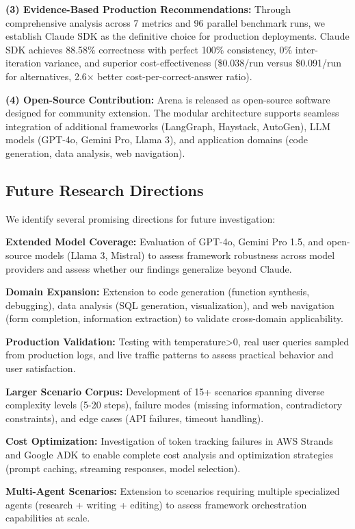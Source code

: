 \documentclass[sigconf,nonacm]{acmart}
\begin{document}
\textbf{(3) Evidence-Based Production Recommendations:} Through comprehensive analysis across 7 metrics and 96 parallel benchmark runs, we establish Claude SDK as the definitive choice for production deployments. Claude SDK achieves 88.58\% correctness with perfect 100\% consistency, 0\% inter-iteration variance, and superior cost-effectiveness (\$0.038/run versus \$0.091/run for alternatives, 2.6× better cost-per-correct-answer ratio).

\textbf{(4) Open-Source Contribution:} Arena is released as open-source software designed for community extension. The modular architecture supports seamless integration of additional frameworks (LangGraph, Haystack, AutoGen), LLM models (GPT-4o, Gemini Pro, Llama 3), and application domains (code generation, data analysis, web navigation).

\subsection{Future Research Directions}

We identify several promising directions for future investigation:

\textbf{Extended Model Coverage:} Evaluation of GPT-4o, Gemini Pro 1.5, and open-source models (Llama 3, Mistral) to assess framework robustness across model providers and assess whether our findings generalize beyond Claude.

\textbf{Domain Expansion:} Extension to code generation (function synthesis, debugging), data analysis (SQL generation, visualization), and web navigation (form completion, information extraction) to validate cross-domain applicability.

\textbf{Production Validation:} Testing with temperature>0, real user queries sampled from production logs, and live traffic patterns to assess practical behavior and user satisfaction.

\textbf{Larger Scenario Corpus:} Development of 15+ scenarios spanning diverse complexity levels (5-20 steps), failure modes (missing information, contradictory constraints), and edge cases (API failures, timeout handling).

\textbf{Cost Optimization:} Investigation of token tracking failures in AWS Strands and Google ADK to enable complete cost analysis and optimization strategies (prompt caching, streaming responses, model selection).

\textbf{Multi-Agent Scenarios:} Extension to scenarios requiring multiple specialized agents (research + writing + editing) to assess framework orchestration capabilities at scale.
\end{document}
